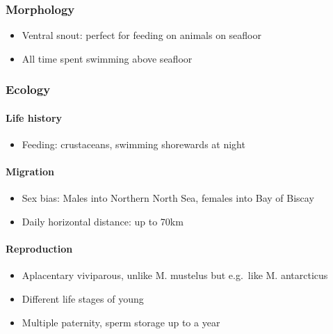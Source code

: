 \documentclass[
  authoryear,
  review,
  3p]{elsarticle}
\let\oldparagraph\paragraph
\renewcommand{\paragraph}[1]{\oldparagraph{#1}\mbox{}}
\providecommand{\tightlist}{%
  \setlength{\itemsep}{0pt}\setlength{\parskip}{0pt}}\usepackage{longtable,booktabs,array}
\begin{document}
\hypertarget{morphology}{%
\subsubsection{Morphology}\label{morphology}}

\begin{itemize}
\tightlist
\item
  Ventral snout: perfect for feeding on animals on seafloor
\item
  All time spent swimming above seafloor
\end{itemize}

\hypertarget{ecology}{%
\subsubsection{Ecology}\label{ecology}}

\hypertarget{life-history}{%
\paragraph{Life history}\label{life-history}}

\begin{itemize}
\tightlist
\item
  Feeding: crustaceans, swimming shorewards at night
\end{itemize}

\hypertarget{migration}{%
\paragraph{Migration}\label{migration}}

\begin{itemize}
\item
  Sex bias: Males into Northern North Sea, females into Bay of Biscay
\item
  Daily horizontal distance: up to 70km
\end{itemize}

\hypertarget{reproduction}{%
\paragraph{Reproduction}\label{reproduction}}

\begin{itemize}
\tightlist
\item
  Aplacentary viviparous, unlike M. mustelus but e.g.~like M.
  antarcticus
\item
  Different life stages of young
\item
  Multiple paternity, sperm storage up to a year
\end{itemize}
\end{document}
